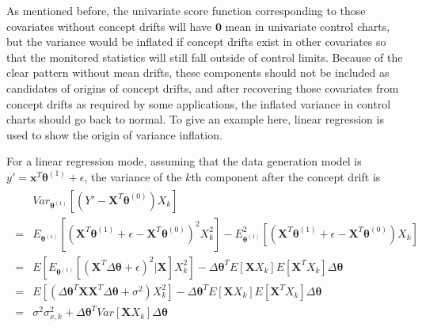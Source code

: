 \documentclass[twoside,11pt]{article}
\begin{document}
As mentioned before, the univariate score function corresponding to those covariates without concept drifts will have $\bm{0}$ mean in univariate control charts, but the variance would be inflated if concept drifts exist in other covariates so that the monitored statistics will still fall outside of control limits. Because of the clear pattern without mean drifts, these components should not be included as candidates of origins of concept drifts, and after recovering those covariates from concept drifts as required by some applications, the inflated variance in control charts should go back to normal. To give an example here, linear regression is used to show the origin of variance inflation.

For a linear regression mode, assuming that the data generation model is $y' = \bm {x}^T\bm { \theta}^{ (1)} + \epsilon$, the variance of the $k$th component after the concept drift is
\begin{align}
\begin{aligned}
&Var _{ \bm{ \theta}^{(1)}}[ (Y'- \bm {X}^T \bm{\theta}^{(0)}  ) X_{k}]   \\
= & E _{\bm{ \theta}^{(1)}} [(\bm {X}^T \bm{\theta}^{(1)}+\epsilon -  \bm {X}^T \bm{\theta}^{(0)}  )^2 X_{k}^2] - E _{\bm{ \theta}^{(1)}}^2 [(\bm {X}^T \bm{\theta}^{(1)}+\epsilon - \bm {X}^T \bm{\theta}^{(0)}) X_{k}]   \\
= & E   [E _{\bm{ \theta}^{(1)}}[(\bm {X}^T\Delta \bm { \theta}  +\epsilon)^2|\bm {X}] X_{k}^2] - \Delta \bm{\theta}^T E   [\bm {X}  X_{k}]E   [\bm {X} ^T X_{k}] \Delta \bm { \theta}    \\
= & E   [ (\Delta \bm { \theta}^T \bm {X} \bm {X} ^T \Delta \bm { \theta} + \sigma^2)X_{k}^2] - \Delta \bm{\theta}^T E   [\bm {X}  X_{k}]E   [\bm {X} ^T X_{k}] \Delta \bm { \theta}    \\
= & \sigma^2 \sigma_{x,k}^2 + \Delta \bm{\theta}^TVar [\bm {X}  X_{k}] \Delta \bm{\theta}
\end{aligned}
\label{eqn:var_aft_cd}
\end{align}
\end{document}

